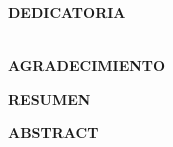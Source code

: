 \documentclass[spanish,12pt,a4paper,twoside,openright]{report}
\newcommand\blankpage{%
	\null
	\thispagestyle{empty}%
	\addtocounter{page}{-1}%
	\newpage}
\begin{document}

\begin{titlepage}

\begin{flushright}
{\large \bf DEDICATORIA}
\\
\textit{}
\\
\textit{} %
\end{flushright}
\end{titlepage}
\blankpage


\begin{titlepage}

\begin{flushright}
{\large \bf AGRADECIMIENTO}
\\
\textit{}
{} %
\end{flushright}
\end{titlepage}
\blankpage


\begin{titlepage}
	
	\begin{flushright}
		{\large \bf RESUMEN}
		\\
		\textit{}
		{} %
	\end{flushright}
\end{titlepage}
\blankpage

\begin{titlepage}
	
	\begin{flushright}
		{\large \bf ABSTRACT}
		\\
		\textit{}
		{} %
	\end{flushright}
\end{titlepage}
\blankpage
\end{document}

